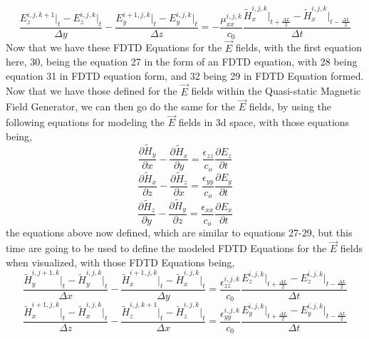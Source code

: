 \documentclass[]{article}
\begin{document}
\begin{equation}
\frac{E_{z}^{i, j, k+1} \Big|_t - E_{z}^{i,j,k}\Big|_t}{\Delta{y}} - \frac{E_{y}^{i+1, j, k} \Big|_t - E_{y}^{i,j,k}\Big|_t}{\Delta{z}} = -\frac{\mu_{xx}^{i,j,k}}{c_0} \frac{\tilde{H}_{x}^{i,j,k}\Big|_{t+\frac{\Delta{L}}{2}} - \tilde{H}_{x}^{i,j,k}\Big|_{t - \frac{\Delta{L}}{2}}}{\Delta{t}}
\end{equation}
Now that we have these FDTD Equations for the $\vec{E}$ fields, with the first equation here, 30, being the equation 27 in the form of an FDTD equation, with 28 being equation 31 in FDTD equation form, and 32 being 29 in FDTD Equation formed. Now that we have those defined for the $\vec{E}$ fields within the Quasi-static Magnetic Field Generator, we can then go do the same for the $\vec{E}$ fields, by using the following equations for modeling the $\vec{E}$ fields in 3d space, with those equations being,
\begin{equation}
\frac{\partial{\tilde{H}}_y}{\partial{x}} - \frac{\partial{\tilde{{H}}}_x}{\partial{y}} = \frac{\epsilon_{zz}}{c_{o}} \frac{\partial{E}_z}{\partial{t}}
\end{equation}
\begin{equation}
\frac{\partial{\tilde{H}}_x}{\partial{z}} - \frac{\partial{\tilde{{H}}}_z}{\partial{x}} = \frac{\epsilon_{yy}}{c_{o}} \frac{\partial{E}_y}{\partial{t}}
\end{equation}
\begin{equation}
\frac{\partial{\tilde{H}}_z}{\partial{y}} - \frac{\partial{\tilde{{H}}}_y}{\partial{z}} = \frac{\epsilon_{xx}}{c_{o}} \frac{\partial{E}_x}{\partial{t}}
\end{equation}
the equations above now defined, which are similar to equations 27-29, but this time are going to be used to define the modeled FDTD Equations for the $\vec{E}$ fields when visualized, with those FDTD Equations being,
\begin{equation}
\frac{\tilde{H}_{y}^{i, j + 1 , k} \Big|_t - \tilde{H}_{y}^{i,j,k}\Big|_t}{\Delta{x}} - \frac{\tilde{H}_{x}^{i + 1, j, k} \Big|_t - \tilde{H}_{x}^{i,j,k}\Big|_t}{\Delta{y}} = \frac{\epsilon_{zz}^{i,j,k}}{c_0} \frac{{E}_{z}^{i,j,k}\Big|_{t+\frac{\Delta{L}}{2}} -E_{z}^{i,j,k}\Big|_{t - \frac{\Delta{L}}{2}}}{\Delta{t}}
\end{equation}
\begin{equation}
\frac{\tilde{H}_{x}^{i+1, j , k} \Big|_t - \tilde{H}_{x}^{i,j,k}\Big|_t}{\Delta{z}} - \frac{\tilde{H}_{z}^{i, j, k + 1} \Big|_t - \tilde{H}_{z}^{i,j,k}\Big|_t}{\Delta{x}} = \frac{\epsilon_{yy}^{i,j,k}}{c_0} \frac{{E}_{y}^{i,j,k}\Big|_{t+\frac{\Delta{L}}{2}} -E_{y}^{i,j,k}\Big|_{t - \frac{\Delta{L}}{2}}}{\Delta{t}}
\end{equation}
\end{document}
